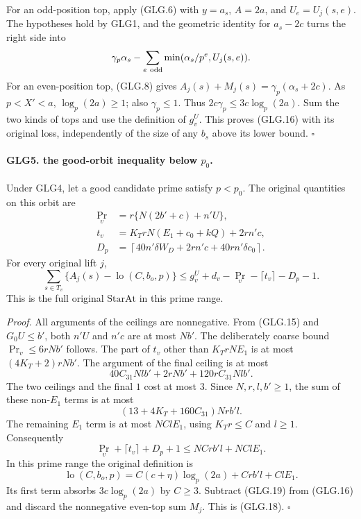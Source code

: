 \documentclass[11pt,a4paper]{article}
\numberwithin{equation}{section}
\theoremstyle{remark}\newtheorem{remark}[theorem]{Remark}
\begin{document}
For an odd-position top, apply (GLG.6) with
\(y=a_s\), \(A=2a\), and \(U_e=U_j(s,e)\). The hypotheses
hold by GLG1, and the geometric identity for \(a_s-2c\)
turns the right side into
\[
 \gamma_p\alpha_s-\sum_{e\ {\rm odd}}
                         \min(\alpha_s/p^e,U_j(s,e)).
 \]
For an even-position top, (GLG.8) gives
\(A_j(s)+M_j(s)=\gamma_p(\alpha_s+2c)\).
As \(p<X'<a\), \(\log_p(2a)\ge1\); also \(\gamma_p\le1\).
Thus \(2c\gamma_p\le3c\log_p(2a)\).
Sum the two kinds of tops and use the definition of \(g_v^U\).
This proves (GLG.16) with its original loss, independently of
the size of any \(b_s\) above its lower bound.
\hfill\(\square\)

\paragraph{GLG5. the good-orbit inequality below \(p_0\).}
\label{claim:GLG5}
Under GLG4, let a good candidate prime satisfy \(p<p_0\).
The original quantities on this orbit are
\[
 \begin{split}
 \Pr_v&=r\{N(2b'+c)+n'U\},\\
 t_v&=K_TrN(E_1+c_0+kQ)+2rn'c,\\
 D_p&=\left\lceil40n'\delta W_D+2rn'c
                                      +40rn'\delta c_0\right\rceil .
 \end{split}                                                       \tag{GLG.17}
\]
For every original lift \(j\),
\[
 \sum_{s\in T_v}\{A_j(s)-\operatorname{lo}(C,b_o,p)\}
       \le g_v^U+d_v-\Pr_v-\lceil t_v\rceil-D_p-1.                 \tag{GLG.18}
\]
This is the full original \(\mathrm{StarAt}\) in this prime range.

\emph{Proof.}
All arguments of the ceilings are nonnegative. From (GLG.15)
and \(G_0U\le b'\), both \(n'U\) and \(n'c\) are at most
\(Nb'\). The deliberately coarse bound
\(\Pr_v\le6rNb'\) follows. The part of \(t_v\) other than
\(K_TrNE_1\) is at most \((4K_T+2)rNb'\).
The argument of the final ceiling is at most
\[
       40C_{31}Nl b'+2rNb'+120rC_{31}Nl b'.
 \]
The two ceilings and the final \(1\) cost at most \(3\).
Since \(N,r,l,b'\ge1\), the sum of these non-\(E_1\) terms
is at most
\[
              (13+4K_T+160C_{31})Nr b'l .
 \]
The remaining \(E_1\) term is at most \(NClE_1\), using
\(K_Tr\le C\) and \(l\ge1\). Consequently
\[
       \Pr_v+\lceil t_v\rceil+D_p+1
                        \le NCr b'l+NClE_1.                     \tag{GLG.19}
\]
In this prime range the original definition is
\[
 \operatorname{lo}(C,b_o,p)
             =C(c+\eta)\log_p(2a)+Crb'l+ClE_1.
 \]
Its first term absorbs \(3c\log_p(2a)\) by \(C\ge3\).
Subtract (GLG.19) from (GLG.16) and discard the nonnegative
even-top sum \(M_j\). This is (GLG.18).
\hfill\(\square\)
\end{document}
